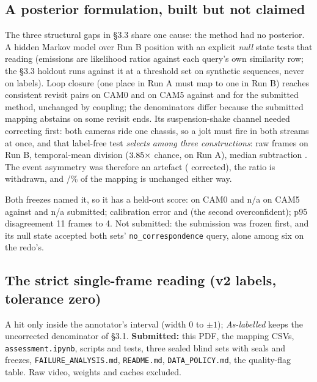 \documentclass[10pt,a4paper]{article}
\providecommand{\VthreebCamFivePrecision}{n/a}
\providecommand{\VthreebPosteriorCamFive}{n/a}
\begin{document}
\subsection{A posterior formulation, built but not claimed}

The three structural gaps in \S3.3 share one cause: the method had no posterior.
A hidden Markov model over Run B position with an explicit \emph{null} state
tests that reading (emissions are likelihood ratios against each query's own
similarity row; the \S3.3 holdout runs against it at a threshold set on synthetic
sequences, never on labels). Loop closure (one place in Run A must map to one in
Run B) reaches \PosteriorClosureCamZero{} consistent revisit pairs on CAM0 and
\PosteriorClosureCamFive{} on CAM5 against \BaselineClosureCamZero{} and
\BaselineClosureCamFive{} for the submitted method, unchanged by coupling; the
denominators differ because the submitted mapping abstains on some revisit ends.
Its suspension-shake channel needed correcting first: both cameras ride one
chassis, so a jolt must fire in both streams at once, and that label-free test
\emph{selects among three constructions}: raw frames \MotionCofireOldRunB{} on
Run B, temporal-mean division \MotionCofireRunB{} ($3.85\times$
chance, \MotionCofireRunA{} on Run A), median subtraction
\MotionCofireMedianRunB{}. The \MotionEventsOld{} event asymmetry was therefore
an artefact (\MotionEventsNew{} corrected), the ratio \MotionWithdrawnRatio{} is
withdrawn, and \MotionMappingIdenticalCamZero/\MotionMappingIdenticalCamFive\% of
the mapping is unchanged either way.

Both freezes named it, so it has a held-out score: \VthreePosteriorCamZero{} on
CAM0 and \VthreebPosteriorCamFive{} on CAM5 against \VthreeCamZeroPrecision{}
and \VthreebCamFivePrecision{} submitted; calibration error \EceCamZero{} and
\EceCamFive{} (the second overconfident); p95 disagreement 11 frames to 4. Not
submitted: the submission was frozen first, and its null state accepted both
sets' \texttt{no\_correspondence} query, alone among six on the redo's.

\subsection{The strict single-frame reading (v2 labels, tolerance zero)}

\vspace{-3pt}
{\footnotesize}

\vspace{-4pt}
{\footnotesize A hit only inside the annotator's interval (width 0 to $\pm1$);
\emph{As-labelled} keeps the uncorrected denominator of \S3.1.
\textbf{Submitted:} this PDF, the mapping CSVs, \texttt{assessment.ipynb},
scripts and tests, three sealed blind sets with seals and freezes,
\texttt{FAILURE\_ANALYSIS.md}, \texttt{README.md}, \texttt{DATA\_POLICY.md}, the
quality-flag table. Raw video, weights and caches excluded.}
\end{document}
